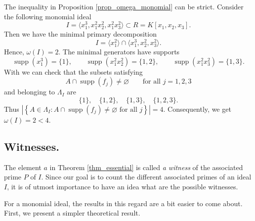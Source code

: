 \documentclass[11pt]{amsart}   %
\begin{document}
\begin{exm} \label{exm_omega_mon} The inequality in Proposition \ref{prop_omega_monomial} can be strict. Consider the following  monomial ideal
\[
I=\langle x_1^3,x_1^2x_2^2,x_1^2x_3^2\rangle \subset R=K[x_1,x_2,x_3].
\]
Then we  have the minimal primary decomposition
\[
I=\langle x_1^2\rangle\cap\langle x_1^3,x_2^2,x_3^2\rangle.
\]
Hence, $\omega(I)=2.$ The minimal generators have supports
\[
\operatorname{supp}(x_1^3)=\{1\},\qquad
\operatorname{supp}(x_1^2x_2^2)=\{1,2\},\qquad
\operatorname{supp}(x_1^2x_3^2)=\{1,3\}.
\]
With \cite{GrSt} we can check that the subsets satisfying
\[
A\cap\operatorname{supp}(f_j)\neq\varnothing
\qquad\text{for all }j=1,2,3
\]
and belonging to $\Lambda_I$ are
\[
\{1\},\quad \{1,2\},\quad \{1,3\},\quad \{1,2,3\}.
\]
Thus $
\left|
\left\{
A\in\Lambda_I:
A\cap\operatorname{supp}(f_j)\neq\varnothing
\text{ for all }j
\right\}
\right|=4.
$
Consequently, we get $\omega(I)=2<4.$
\end{exm}









\medskip

\subsection{Witnesses.} \label{sec_witness} The element $a$ in Theorem \ref{thm_essential} is called {\em a witness} of the associated prime $P$ of $I$. Since our goal is to count the different associated primes of an ideal $I$, it is of utmost importance to have an idea what are the possible witnesses.

For a monomial ideal, the results in this regard are a bit easier to come about. First, we present a simpler theoretical result.
\end{document}
